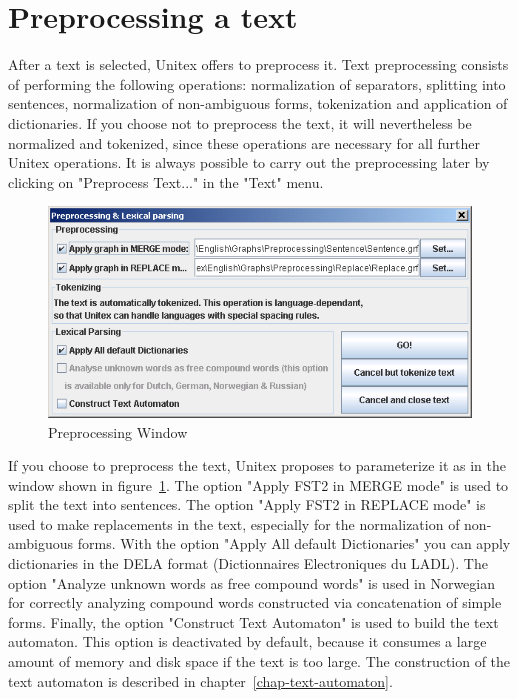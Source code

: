  

\section{Preprocessing a text}
After a text is selected, Unitex offers to preprocess it. Text preprocessing
consists of performing the following operations: normalization of separators,
splitting into sentences, normalization of non-ambiguous forms, tokenization and 
application of dictionaries. If you choose not to preprocess the text, it 
will nevertheless be normalized and tokenized, since
these operations are necessary for all further Unitex operations. It is always
possible to carry out the preprocessing later by clicking on "Preprocess Text..."
in the "Text" menu. 

\begin{figure}[!ht]
\begin{center}
\includegraphics[width=15cm]{resources/img/fig2-9.png}
\caption{Preprocessing Window\label{fig-preprocessing-frame}}
\end{center}
\end{figure}

\bigskip
\noindent 
If you choose to preprocess the text, Unitex proposes to parameterize it
as in the window shown in figure~\ref{fig-preprocessing-frame}.
The option "Apply FST2 in MERGE mode" is used to split the text into sentences.
The option "Apply FST2 in REPLACE mode" is used to make replacements in the text,
especially for the normalization of non-ambiguous forms. With the option "Apply
All default Dictionaries" you can apply dictionaries in the DELA format
(Dictionnaires Electroniques du LADL). The option "Analyze unknown
words as free compound words" is used in Norwegian for correctly analyzing
compound words  constructed via concatenation of simple forms.  Finally, the
option "Construct Text Automaton" is used to build the text automaton. This
option is deactivated by default, because it consumes a large amount of memory
and disk space if the text is too large. The construction of the text automaton
is described in chapter~\ref{chap-text-automaton}.


